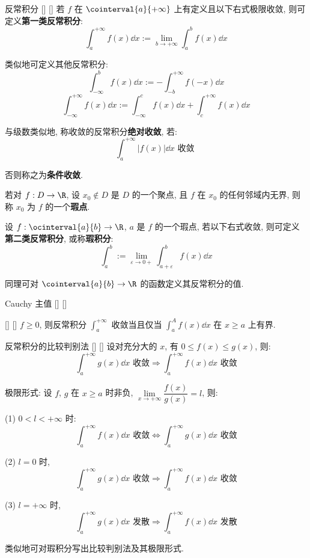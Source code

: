 \documentclass[UTF8]{ctexart}
\begin{document}
            \begin{dfn}
			    []
			    {反常积分}
			    []
			    []
                若 \(f\) 在 \(\cointerval{a}{+\infty}\) 上有定义且以下右式极限收敛, 则可定义\textbf{第一类反常积分}: 
                \[\int_a^{+\infty}f(x)\dd x:=\lim_{b\to+\infty}\int_a^b f(x)\dd x\]

                类似地可定义其他反常积分: 
                \[\int_{-\infty}^b f(x)\dd x:=-\int_{-b}^{+\infty} f(-x)\dd x\]
                \[\int_{-\infty}^{+\infty} f(x)\dd x:=\int_{-\infty}^c f(x)\dd x+\int_c^{+\infty} f(x)\dd x\]

				与级数类似地, 称收敛的反常积分\textbf{绝对收敛}, 若: 
				\[\int_a^{+\infty}|f(x)|\dd x\text{ 收敛 }\]
				
				否则称之为\textbf{条件收敛}. 

				若对 \(f:D\to\R\), 设 \(x_0\notin D\) 是 \(D\) 的一个聚点, 且 \(f\) 在 \(x_0\) 的任何邻域内无界, 则称 \(x_0\) 为 \(f\) 的一个\textbf{瑕点}. 

				设 \(f:\ocinterval{a}{b}\to\R\), \(a\) 是 \(f\) 的一个瑕点, 若以下右式收敛, 则可定义\textbf{第二类反常积分}, 或称\textbf{瑕积分}: 
				\[\int_a^b:=\lim_{\varepsilon\to 0+}\int_{a+\varepsilon}^b f(x)\dd x\]

				同理可对 \(\cointerval{a}{b}\to\R\) 的函数定义其反常积分的值. 
            \end{dfn}
			
			\begin{dfn}
			    []
			    {Cauchy 主值}
			    []
			    []
			\end{dfn}
			
			\begin{thm}
				[]
				{}
				[]
				[]
				\(f\geq 0\), 则反常积分 \(\int_a^{+\infty}\) 收敛当且仅当 \(\int_a^A f(x)\dd x\) 在 \(x\geq a\) 上有界. 
			\end{thm}

			\begin{thm}
			    []
			    {反常积分的比较判别法}
			    []
			    []
				设对充分大的 \(x\), 有 \(0\leq f(x)\leq g(x)\), 则: 
				\[\int_a^{+\infty}g(x)\dd x\text{ 收敛}
				\Longrightarrow\int_a^{+\infty}f(x)\dd x\text{ 收敛}\]

			    {}
			    {极限形式: }
			    {}
			    {}
				设 \(f\), \(g\) 在 \(x\geq a\) 时非负, \(\lim\limits_{x\to+\infty}\dfrac{f(x)}{g(x)}=l\), 则: 

				(1) \(0<l<+\infty\) 时: 
				\[\int_a^{+\infty}f(x)\dd x\text{ 收敛}\iff\int_a^{+\infty}g(x)\dd x\text{ 收敛}\]

				(2) \(l=0\) 时, 
				\[\int_a^{+\infty}g(x)\dd x\text{ 收敛}\Longrightarrow\int_a^{+\infty}f(x)\dd x\text{ 收敛}\]

				(3) \(l=+\infty\) 时, 
				\[\int_a^{+\infty}g(x)\dd x\text{ 发散}\Longrightarrow\int_a^{+\infty}f(x)\dd x\text{ 发散}\]

				类似地可对瑕积分写出比较判别法及其极限形式. 
			\end{thm}
\end{document}
